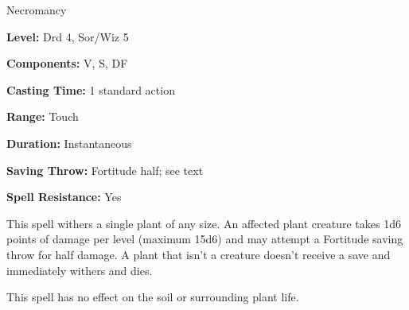
Necromancy

\textbf{Level:} Drd 4, Sor/Wiz 5

\textbf{Components:} V, S, DF

\textbf{Casting Time:} 1 standard action

\textbf{Range:} Touch

\textbf{Duration:} Instantaneous

\textbf{Saving Throw:} Fortitude half; see text

\textbf{Spell Resistance:} Yes

This spell withers a single plant of any size. An affected plant creature takes 
1d6 points of damage per level (maximum 15d6) and may attempt a Fortitude saving 
throw for half damage. A plant that isn't a creature doesn't receive a save and 
immediately withers and dies.

This spell has no effect on the soil or surrounding plant life.

